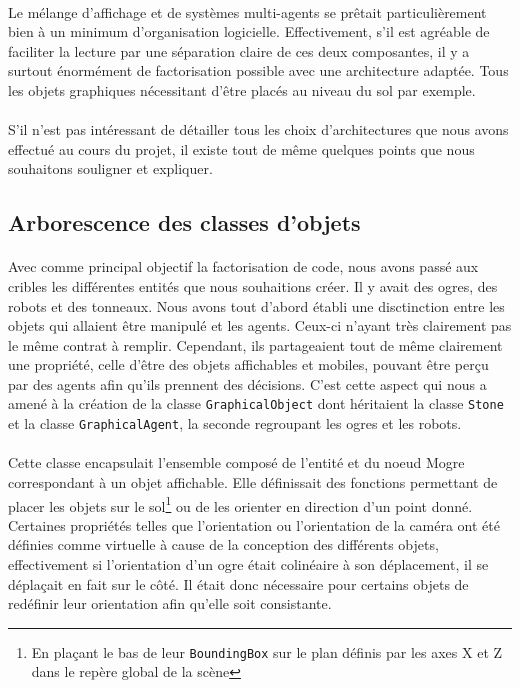 \paragraph{}
Le mélange d'affichage et de systèmes multi-agents se prêtait particulièrement
bien à un minimum d'organisation logicielle. Effectivement, s'il est agréable
de faciliter la lecture par une séparation claire de ces deux composantes, il
y a surtout énormément de factorisation possible avec une architecture
adaptée. Tous les objets graphiques nécessitant d'être placés au niveau du sol
par exemple.

\paragraph{}
S'il n'est pas intéressant de détailler tous les choix d'architectures que
nous avons effectué au cours du projet, il existe tout de même quelques points
que nous souhaitons souligner et expliquer.

\subsection{Arborescence des classes d'objets}
\paragraph{}
Avec comme principal objectif la factorisation de code, nous avons passé aux
cribles les différentes entités que nous souhaitions créer. Il y avait des
ogres, des robots et des tonneaux. Nous avons tout d'abord établi une
disctinction entre les objets qui allaient être manipulé et les agents.
Ceux-ci n'ayant très clairement pas le même contrat à remplir. Cependant, ils
partageaient tout de même clairement une propriété, celle d'être des objets
affichables et mobiles, pouvant être perçu par des agents afin qu'ils prennent
des décisions. C'est cette aspect qui nous a amené à la création de la classe
\verb!GraphicalObject! dont héritaient la classe \verb!Stone! et la classe
\verb!GraphicalAgent!,  la seconde regroupant les ogres et les robots.

\paragraph{}
Cette classe encapsulait l'ensemble composé de l'entité et du noeud Mogre
correspondant à un objet affichable. Elle définissait des fonctions permettant
de placer les objets sur le sol\footnote{En plaçant le bas de leur
\verb!BoundingBox! sur le plan définis par les axes X et Z dans le repère
global de la scène} ou de les orienter en direction d'un point donné.
Certaines propriétés telles que l'orientation ou l'orientation de la caméra
ont été définies comme virtuelle à cause de la conception des différents
objets, effectivement si l'orientation d'un ogre était colinéaire à son
déplacement, il se déplaçait en fait sur le côté. Il était donc nécessaire
pour certains objets de redéfinir leur orientation afin qu'elle soit
consistante.

